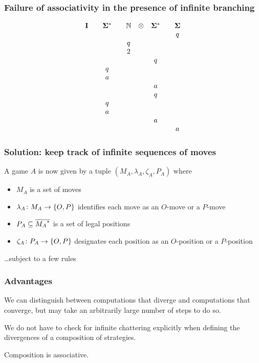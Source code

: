 \documentclass{beamer}
\begin{document}
\begin{frame}
  \frametitle{Failure of associativity in the presence of infinite branching}
  \begingroup
  \renewcommand*{\arraystretch}{1}
  \[
    \begin{array}{ccccccccc}
      \mathbf{I} & & \mathbf{\Sigma^*} & & \mathbf{\mathbb{N}} & \otimes & \mathbf{\Sigma^*} & & \mathbf{\Sigma} \\
       & &   & &   & &   & & q \\
       & &   & & q & &   & &   \\
       & &   & & 2 & &   & &   \\
       & &   & &   & & q & &   \\
       & & q & &   & &   & &   \\
       & & a & &   & &   & &   \\
       & &   & &   & & a & &   \\
       & &   & &   & & q & &   \\
       & & q & &   & &   & &   \\
       & & a & &   & &   & &   \\
       & &   & &   & & a & &   \\
       & &   & &   & &   & & a
    \end{array}
    \]
  \endgroup
\end{frame}

\begin{frame}
  \frametitle{Solution: keep track of infinite sequences of moves}
  A game $A$ is now given by a tuple $(M_A, \lambda_A, \zeta_A, P_A)$ where
  \begin{itemize}
    \item $M_A$ is a set of moves
    \item $\lambda_A\colon M_A\to \{O,P\}$ identifies each move as an $O$-move or a $P$-move
    \item $P_A\subseteq {\overline{{M_A}^{*}}}$ is a set of legal positions
    \item $\zeta_A\colon P_A\to\{O,P\}$ designates each position as an $O$-position or a $P$-position
  \end{itemize}
  \dots subject to a few rules
\end{frame}

\begin{frame}
  \frametitle{Advantages}
  \pause
  We can distinguish between computations that diverge and computations that converge, but may take an arbitrarily large number of steps to do so.

  \pause
  We do not have to check for infinite chattering explicitly when defining the divergences of a composition of strategies.

  \pause
  Composition is associative.
\end{frame}
\end{document}
